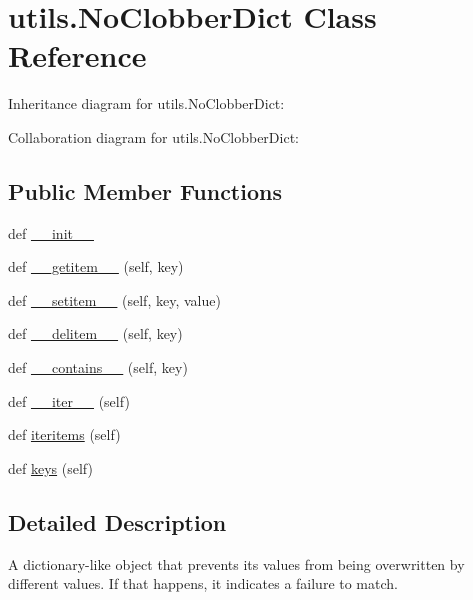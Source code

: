 \hypertarget{classutils_1_1_no_clobber_dict}{}\section{utils.\+No\+Clobber\+Dict Class Reference}
\label{classutils_1_1_no_clobber_dict}


Inheritance diagram for utils.\+No\+Clobber\+Dict\+:


Collaboration diagram for utils.\+No\+Clobber\+Dict\+:
\subsection*{Public Member Functions}
\begin{DoxyCompactItemize}
\item 
def \hyperlink{classutils_1_1_no_clobber_dict_a0d4022673393e0614cc9a1e7dddd4fb8}{\+\_\+\+\_\+init\+\_\+\+\_\+}
\item 
def \hyperlink{classutils_1_1_no_clobber_dict_a21a355aec8d053f5981dee3c81264ca3}{\+\_\+\+\_\+getitem\+\_\+\+\_\+} (self, key)
\item 
def \hyperlink{classutils_1_1_no_clobber_dict_a51eecaf26361fe54d75c5cdbbef23798}{\+\_\+\+\_\+setitem\+\_\+\+\_\+} (self, key, value)
\item 
def \hyperlink{classutils_1_1_no_clobber_dict_a57dbccd0e05034d69117df6609f7462e}{\+\_\+\+\_\+delitem\+\_\+\+\_\+} (self, key)
\item 
def \hyperlink{classutils_1_1_no_clobber_dict_a91e55d58244b27989bceaf6b15702599}{\+\_\+\+\_\+contains\+\_\+\+\_\+} (self, key)
\item 
def \hyperlink{classutils_1_1_no_clobber_dict_af3c56896d77832df23cffc8b74ff8bd3}{\+\_\+\+\_\+iter\+\_\+\+\_\+} (self)
\item 
def \hyperlink{classutils_1_1_no_clobber_dict_a5893c36f395ee8ff67c895f70345cd4b}{iteritems} (self)
\item 
def \hyperlink{classutils_1_1_no_clobber_dict_a9c9fe2d7a25239edbaa0e697e4821ef1}{keys} (self)
\end{DoxyCompactItemize}


\subsection{Detailed Description}
\begin{DoxyVerb}A dictionary-like object that prevents its values from being
overwritten by different values. If that happens, it indicates a
failure to match.
\end{DoxyVerb}
 


